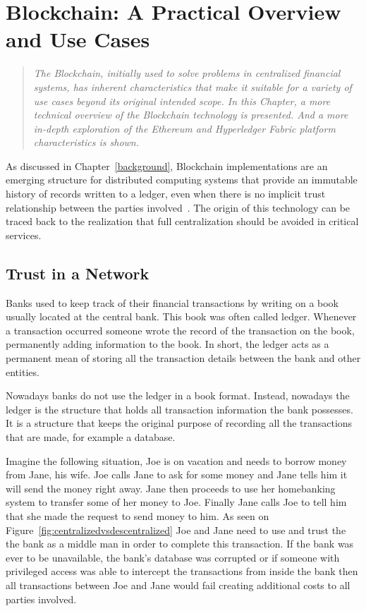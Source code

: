 \chapter{Blockchain: A Practical Overview and Use Cases}\label{blockchain}

\begin{quote} 
  \emph{The Blockchain, initially used to solve problems in centralized
  financial systems, has inherent characteristics that make it suitable for a
  variety of use cases beyond its original intended scope. In this Chapter, a more technical overview of the Blockchain technology is presented. And a more in-depth exploration of the Ethereum and Hyperledger Fabric platform
  characteristics is shown.}
\end{quote}

As discussed in Chapter~\ref{background}, Blockchain implementations are an
emerging structure for distributed computing systems that provide an immutable
history of records written to a ledger, even when there is no implicit trust
relationship between the parties involved~\cite{Barclay2017}. The origin of
this technology can be traced back to the realization that full centralization
should be avoided in critical services.

\section{Trust in a Network}

Banks used to keep track of their financial transactions by writing on a book
usually located at the central bank. This book was often called ledger.
Whenever a transaction occurred someone wrote the record of the transaction on
the book, permanently adding information to the book. In short, the ledger acts
as a permanent mean of storing all the transaction details between the bank and
other entities. 

Nowadays banks do not use the ledger in a book format. Instead, nowadays the
ledger is the structure that holds all transaction information the bank
possesses. It is a structure that keeps the original purpose of recording all
the transactions that are made, for example a database.

Imagine the following situation, Joe is on vacation and needs to borrow money
from Jane, his wife. Joe calls Jane to ask for some money and Jane tells him it
will send the money right away. Jane then proceeds to use her homebanking
system to transfer some of her money to Joe. Finally Jane calls Joe to tell him
that she made the request to send money to him.  As seen on
Figure~\ref{fig:centralizedvsdescentralized} Joe and Jane need to use and trust
the the bank as a middle man in order to complete this transaction. If the bank
was ever to be unavailable, the bank's database was corrupted or if someone
with  privileged access was able to intercept the transactions from inside the
bank then all transactions between Joe and Jane would fail creating additional
costs to all parties involved. 

